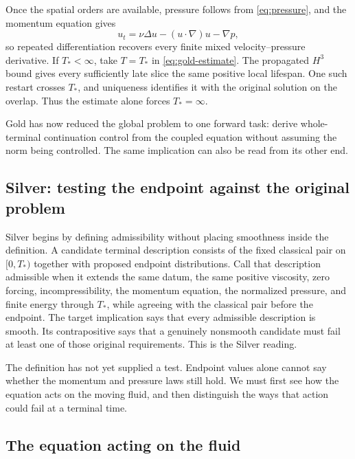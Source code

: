 Once the spatial orders are available, pressure follows from
\eqref{eq:pressure}, and the momentum equation gives
\begin{equation*}
 u_t=\nu\Delta u-(u\cdot\nabla)u-\nabla p,
\end{equation*}
so repeated differentiation recovers every finite mixed velocity--pressure
derivative.  If \(T_*<\infty\), take \(T=T_*\) in
\eqref{eq:gold-estimate}.  The propagated \(H^3\) bound gives every sufficiently
late slice the same positive local lifespan.  One such restart crosses
\(T_*\), and uniqueness identifies it with the original solution on the
overlap.  Thus the estimate alone forces \(T_*=\infty\).

Gold has now reduced the global problem to one forward task: derive
whole-terminal continuation control from the coupled equation without assuming
the norm being controlled.  The same implication can also be read from its
other end.

\subsection{Silver: testing the endpoint against the original problem}
\label{sec:silver-standard}

Silver begins by defining admissibility without placing smoothness inside the
definition.  A candidate terminal description consists of the fixed classical
pair on \([0,T_*)\) together with proposed endpoint distributions.  Call that
description admissible when it extends the same datum, the same positive
viscosity, zero forcing, incompressibility, the momentum equation, the
normalized pressure, and finite energy through \(T_*\), while agreeing with
the classical pair before the endpoint.  The target implication says that
every admissible description is smooth.  Its contrapositive says that a
genuinely nonsmooth candidate must fail at least one of those original
requirements.  This is the Silver reading.

The definition has not yet supplied a test.  Endpoint values alone cannot say
whether the momentum and pressure laws still hold.  We must first see how the
equation acts on the moving fluid, and then distinguish the ways that action
could fail at a terminal time.

\subsection{The equation acting on the fluid}
\label{sec:membership-participation}

